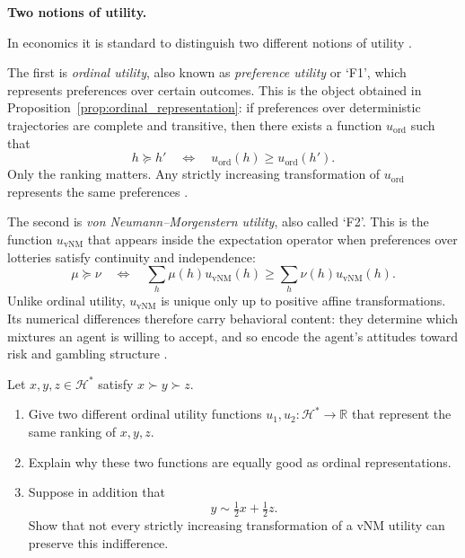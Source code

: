 \documentclass[11pt]{article}
\newcommand{\Hcal}{\mathcal{H}}
\newcommand{\R}{\mathbb{R}}
\newcommand{\pref}{\succcurlyeq}
\newcommand{\strictpref}{\succ}
\newcommand{\indiff}{\sim}
\begin{document}
\medskip
\begin{callout}
\textbf{Two notions of utility.}

In economics it is standard to distinguish two different notions of utility
\citep{kreps1988notes,mascolell1995micro}.

The first is \emph{ordinal utility}, also known as \emph{preference utility} or
`F1', which represents preferences over certain outcomes. This is the object
obtained in Proposition~\ref{prop:ordinal_representation}: if preferences over
deterministic trajectories are complete and transitive, then there exists a
function $u_{\mathrm{ord}}$ such that
\[
h\pref h'
\quad\Longleftrightarrow\quad
u_{\mathrm{ord}}(h)\geq u_{\mathrm{ord}}(h').
\]
Only the ranking matters. Any strictly increasing transformation of
$u_{\mathrm{ord}}$ represents the same preferences \citep{fishburn1970utility}.

The second is \emph{von Neumann--Morgenstern utility}, also called `F2'. This is the function
$u_{\mathrm{vNM}}$ that appears inside the expectation operator when
preferences over lotteries satisfy continuity and independence:
\[
\mu\pref\nu
\quad\Longleftrightarrow\quad
\sum_h \mu(h)u_{\mathrm{vNM}}(h)\geq \sum_h \nu(h)u_{\mathrm{vNM}}(h).
\]
Unlike ordinal utility, $u_{\mathrm{vNM}}$ is unique only up to positive affine
transformations. Its numerical differences therefore carry behavioral content:
they determine which mixtures an agent is willing to accept, and so encode the
agent's attitudes toward risk and gambling structure
\citep{vonneumann1944theory,mascolell1995micro}.

\end{callout}
\medskip


\begin{exercise}
\label{ex:ordinal-vs-vnm}
Let $x,y,z\in\Hcal^*$ satisfy $x\strictpref y\strictpref z$.
\begin{enumerate}[label=(\alph*)]
\item Give two different ordinal utility functions $u_1,u_2\colon\Hcal^*\to\R$
that represent the same ranking of $x,y,z$.
\item Explain why these two functions are equally good as ordinal
representations.
\item Suppose in addition that
\[
y \indiff \tfrac12 x + \tfrac12 z.
\]
Show that not every strictly increasing transformation of a vNM utility can
preserve this indifference.
\end{enumerate}
\end{exercise}
\end{document}
